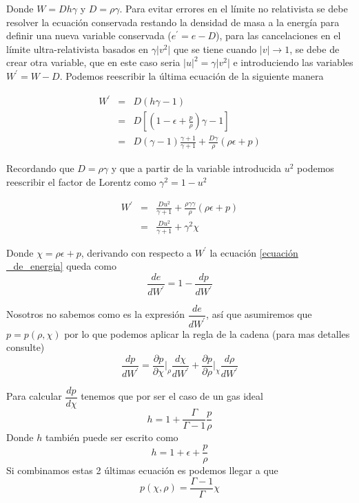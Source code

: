 \documentclass[12pt,a4paper]{book}
\providecommand{\abs}[1]{\lvert#1\rvert} %
\begin{document}
Donde $W=D h \gamma$ y $D=\rho \gamma$. Para evitar errores en el límite no relativista se debe resolver la ecuación conservada restando la densidad de masa 
a la energía para definir una nueva variable conservada ($e^{'}=e-D$), para las cancelaciones en el límite ultra-relativista basados en $\gamma \abs{v^2}$ que se tiene cuando $\abs{v} \rightarrow 1$, se debe de crear otra variable, que en este caso seria $\abs{u}^2=\gamma \abs{v^2}$ e introduciendo las variables $W^{'}=W-D$. Podemos reescribir la última ecuación de la siguiente manera

\begin{eqnarray*}
 W^{'}& = &D(h \gamma -1)\\
&=& D\left[ \left(1-\epsilon+ \frac{p}{\rho}\right) \gamma - 1 \right]\\
&=& D \left(\gamma-1 \right) \frac{\gamma+1}{\gamma+1}+\frac{D \gamma }{\rho}\left(\rho \epsilon + p \right)
\end{eqnarray*}

Recordando que $D=\rho \gamma$ y que a partir de la variable introducida $u^{2}$ podemos 
reescribir el factor de Lorentz como $\gamma^{2} = 1-u^{2}$

\begin{eqnarray}\label{W_prima}
\nonumber W^{'}&=&\frac{D u^{2}}{\gamma + 1}
+\frac{\rho\gamma \gamma}{ \rho }\left(\rho \epsilon + p \right)\\
&=& \frac{D u^{2}}{\gamma + 1} + \gamma^{2} \chi
\end{eqnarray}

Donde $\chi=\rho \epsilon + p$, derivando con respecto a $W^{'}$ la ecuación \ref{ecuación  _de_energia} queda como
\begin{equation}\label{derivada_E_W}
\dfrac{de}{dW^{'}}=1-\dfrac{dp}{dW^{'}}
\end{equation}

Nosotros no sabemos como es la expresión $\dfrac{de}{dW^{'}}$, así que asumiremos que $p=p(\rho, \chi)$ por lo que podemos aplicar la regla de la cadena (para mas detalles consulte)
\begin{equation}\label{cadena}
\dfrac{dp}{dW^{'}}=\dfrac{\partial p}{\partial\chi}\Bigg |_{\rho} \dfrac{d\chi}{dW^{'}} + \dfrac{\partial p}{\partial \rho}\Big |_{\chi} \dfrac{d \rho}{d W^{'}}
\end{equation}

Para calcular $\dfrac{dp}{d\chi}$ tenemos que por ser el caso de un gas ideal
\begin{equation} \label{entalpía_función_presion_densidad}
h=1+\frac{\Gamma}{\Gamma-1}\frac{p}{\rho}
\end{equation}
Donde $h$ también puede ser escrito como
\begin{equation}
h=1+\epsilon+\frac{p}{\rho}
\end{equation}
Si combinamos estas 2 últimas ecuación  es podemos llegar a que 
\begin{equation}
p(\chi,\rho)=\frac{\Gamma-1}{\Gamma}\chi
\end{equation}
\end{document}

